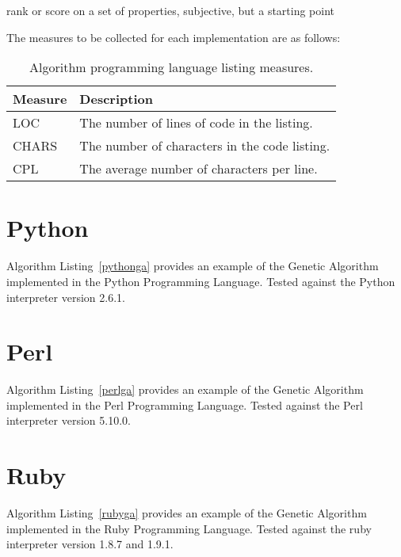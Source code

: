 \documentclass[a4paper, 11pt]{article}
\begin{document}
rank or score on a set of properties, subjective, but a starting point

The measures to be collected for each implementation are as follows:

\begin{table}[ht]
	\centering
		\begin{tabularx}{\textwidth}{lX}
		\toprule
		\textbf{Measure} & \textbf{Description} \\ 
		\toprule
		LOC & The number of lines of code in the listing. \\
		CHARS & The number of characters in the code listing. \\
		CPL & The average number of characters per line. \\
		\bottomrule
		\end{tabularx}	
	\caption{Algorithm programming language listing measures.}
	\label{tab:measures}
\end{table}

% 
% 
\section{Python}
\label{sec:python}
Algorithm Listing~\ref{pythonga} provides an example of the Genetic Algorithm implemented in the Python Programming Language. Tested against the Python interpreter version 2.6.1.


% 
% 
\section{Perl}
\label{sec:perl}
Algorithm Listing~\ref{perlga} provides an example of the Genetic Algorithm implemented in the Perl Programming Language. Tested against the Perl interpreter version 5.10.0.


% 
% 
\section{Ruby}
\label{sec:ruby}
Algorithm Listing~\ref{rubyga} provides an example of the Genetic Algorithm implemented in the Ruby Programming Language. Tested against the ruby interpreter version 1.8.7 and 1.9.1.

\end{document}
